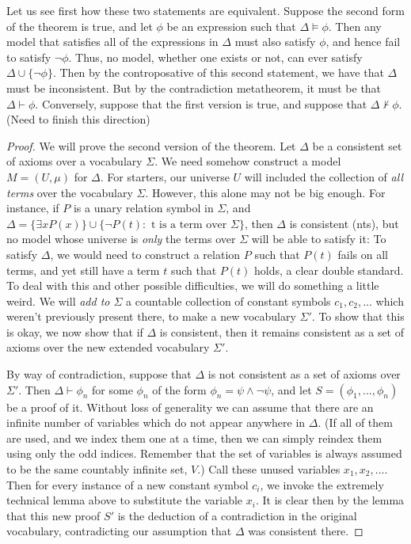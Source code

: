 Let us see first how these two statements are equivalent. Suppose the second form of the theorem is true, and let $\phi$ be an expression such that $\Delta \models \phi$. Then any model that satisfies all of the expressions in $\Delta$ must also satisfy $\phi$, and hence fail to satisfy $\neg \phi$. Thus, no model, whether one exists or not, can ever satisfy $\Delta \cup \{\neg \phi\}$. Then by the controposative of this second statement, we have that $\Delta$ must be inconsistent. But by the contradiction metatheorem, it must be that $\Delta \vdash \phi$. Conversely, suppose that the first version is true, and suppose that $\Delta \nvdash \phi$. (Need to finish this direction)
\begin{proof}
    We will prove the second version of the theorem. Let $\Delta$ be a consistent set of axioms over a vocabulary $\Sigma$. We need somehow construct a model $M = (U,\mu)$ for $\Delta$. For starters, our universe $U$ will included the collection of \textit{all terms} over the vocabulary $\Sigma$. However, this alone may not be big enough. For instance, if $P$ is a unary relation symbol in $\Sigma$, and $\Delta = \{\exists x P(x)\} \cup \{\neg P(t): \textrm{ t is a term over $\Sigma$}\}$, then $\Delta$ is consistent (nts), but no model whose universe is \textit{only} the terms over $\Sigma$ will be able to satisfy it: To satisfy $\Delta$, we would need to construct a relation $P$ such that $P(t)$ fails on all terms, and yet still have a term $t$ such that $P(t)$ holds, a clear double standard. To deal with this and other possible difficulties, we will do something a little weird. We will \textit{add to $\Sigma$} a countable collection of constant symbols $c_1,c_2,...$ which weren't previously present there, to make a new vocabulary $\Sigma'$. To show that this is okay, we now show that if $\Delta$ is consistent, then it remains consistent as a set of axioms over the new extended vocabulary $\Sigma'$.
    \par By way of contradiction, suppose that $\Delta$ is not consistent as a set of axioms over $\Sigma'$. Then $\Delta \vdash \phi_n$ for some $\phi_n$ of the form $\phi_n = \psi \wedge \neg \psi$, and let $S = (\phi_1,...,\phi_n)$ be a proof of it. Without loss of generality we can assume that there are an infinite number of variables which do not appear anywhere in $\Delta$. (If all of them are used, and we index them one at a time, then we can simply reindex them using only the odd indices. Remember that the set of variables is always assumed to be the same countably infinite set, $V$.) Call these unused variables $x_1,x_2,...$. Then for every instance of a new constant symbol $c_i$, we invoke the extremely technical lemma above to substitute the variable $x_i$. It is clear then by the lemma that this new proof $S'$ is the deduction of a contradiction in the original vocabulary, contradicting our assumption that $\Delta$ was consistent there.

\end{proof}
